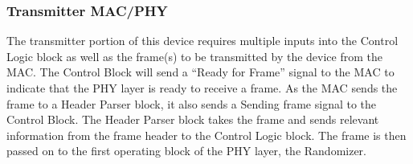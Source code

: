 ﻿\documentclass[10pt]{article}
\begin{document}
\subsubsection{Transmitter MAC/PHY}
The transmitter portion of this device requires multiple inputs into the Control Logic block as well as the frame(s) to be transmitted by the device from the MAC. 
The Control Block will send a “Ready for Frame” signal to the MAC to indicate that the PHY layer is ready to receive a frame. As the MAC sends the frame to a Header Parser block, it also sends a Sending frame signal to the Control Block. The Header Parser block takes the frame and sends relevant information from the frame header to the Control Logic block. The frame is then passed on to the first operating block of the PHY layer, the Randomizer.  
\end{document}
